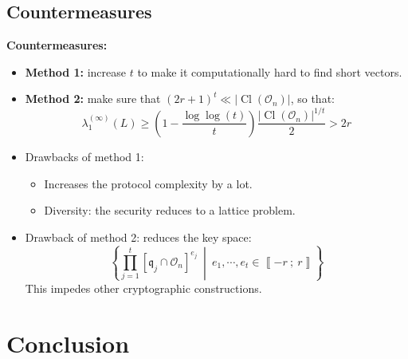 \documentclass[10pt]{beamer}
\theoremstyle{plain}
\theoremstyle{definition}
\newcommand{\mO}{\mathcal{O}}
\renewcommand{\i}[2]{\left\llbracket #1~;~#2\right\rrbracket}
\renewcommand{\(}{\left(}
\renewcommand{\)}{\right)}
\newcommand{\mf}[1]{\mathfrak{#1}}
\DeclareMathOperator{\Cl}{Cl}
\begin{document}
\subsection{Countermeasures}

\begin{frame}
\textbf{Countermeasures:}

\vspace{0.5cm}
\begin{itemize}
\item \textbf{Method 1:} increase $t$ to make it computationally hard to find short vectors.

\item \textbf{Method 2:} make sure that $(2r+1)^t\ll |\Cl(\mO_n)|$, so that:
\[ \lambda_1^{(\infty)}(L)\geq \(1-\frac{\log\log(t)}{t}\)\frac{|\Cl(\mO_n)|^{1/t}}{2}> 2r\]
\pause 
\item Drawbacks of method 1:
\begin{itemize}
\item Increases the protocol complexity by a lot.
\item Diversity: the security reduces to a lattice problem.
\end{itemize}
\pause
\item Drawback of method 2: reduces the key space:
\[\left\{\prod_{j=1}^t [\mf{q}_j\cap\mO_n]^{e_j} \ \middle| \ e_1,\cdots, e_t\in\i{-r}{r} \right\}\]
This impedes other cryptographic constructions.
\end{itemize}
\end{frame}

\section{Conclusion}
\end{document}
